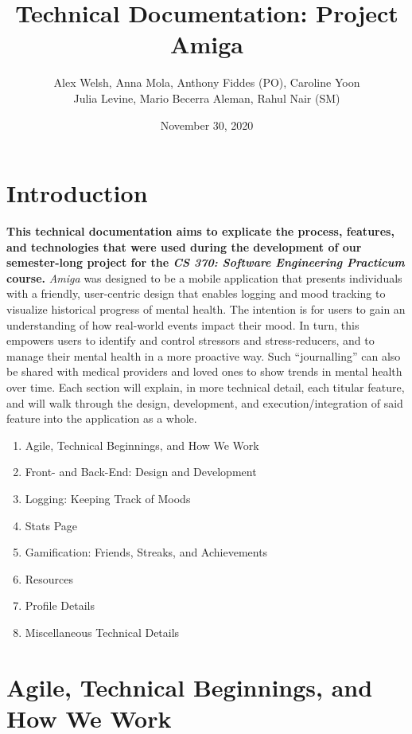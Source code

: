 \documentclass[10pt,american english]{article}
\title{Technical Documentation: Project Amiga}
\author{Alex Welsh, Anna Mola, Anthony Fiddes (PO), Caroline Yoon\\ Julia Levine, Mario Becerra Aleman, Rahul Nair (SM)}
\date{November 30, 2020}
\begin{document}
\maketitle
\section*{Introduction}
\textbf{This technical documentation aims to explicate the process, features, and technologies that were used during the development of our semester-long project for the\textit{ CS 370: Software Engineering Practicum} course.}
\newline \newline 
\textit{Amiga} was designed to be a mobile application that presents individuals with a friendly, user-centric design that enables logging and mood tracking to visualize historical progress of mental health. The intention is for users to gain an understanding of how real-world events impact their mood. In turn, this empowers users to identify and control stressors and stress-reducers, and to manage their mental health in a more proactive way. Such ``journalling'' can also be shared with medical providers and loved ones to show trends in mental health over time. 
\newline \newline 
Each section will explain, in more technical detail, each titular feature, and will walk through the design, development, and execution/integration of said feature into the application as a whole.
\begin{enumerate}
\item Agile, Technical Beginnings, and How We Work
\item Front- and Back-End: Design and Development
\item Logging: Keeping Track of Moods
\item Stats Page
\item Gamification: Friends, Streaks, and Achievements
\item Resources
\item Profile Details
\item Miscellaneous Technical Details
\end{enumerate}

\section*{Agile, Technical Beginnings, and How We Work}
\end{document}
